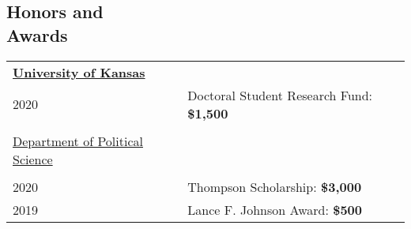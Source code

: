 \documentclass[margin,line,pifont,palatino,courier]{res}
\begin{document}
\begin{resume}

\section{\sc Honors and\\ Awards}

\begin{tabular}{ll}
  \textbf{\underline{University of Kansas}} &\\
  2020       & Doctoral Student Research Fund: \bf{\$1,500}\\
  \\
  \underline{Department of Political Science}&\\
  \\
  2020       & Thompson Scholarship: \bf{\$3,000}\\
  2019       & Lance F. Johnson Award: \bf{\$500}\\

\end{tabular}
\end{resume}
\end{document}
